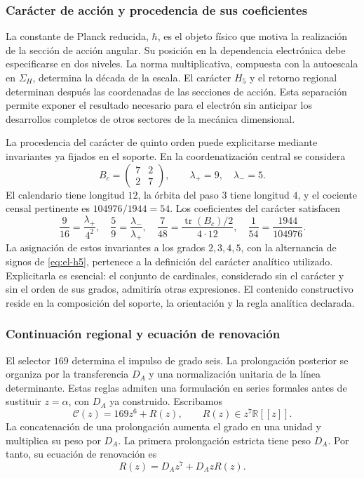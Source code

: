 \subsubsection{Carácter de acción y procedencia de sus coeficientes}
\label{sec:revision-planck}

La constante de Planck reducida, \(\hbar\), es el objeto físico que
motiva la realización de la sección de acción angular. Su posición en
la dependencia electrónica debe especificarse en dos niveles. La norma
multiplicativa, compuesta con la autoescala en \(\Sigma_H\), determina la década de la escala. El carácter
\(H_5\) y el retorno regional determinan después las coordenadas de las
secciones de acción. Esta separación permite exponer el resultado
necesario para el electrón sin anticipar los desarrollos completos de
otros sectores de la mecánica dimensional.

La procedencia del carácter de quinto orden puede explicitarse mediante
invariantes ya fijados en el soporte. En la coordenatización central se considera
\[
 B_c=\begin{pmatrix}7&2\\2&7\end{pmatrix},
 \qquad \lambda_+=9,\quad\lambda_-=5.
\]
El calendario tiene longitud \(12\), la órbita del paso \(3\) tiene
longitud \(4\), y el cociente censal pertinente es
\(104976/1944=54\). Los coeficientes del carácter satisfacen
\begin{equation}
 \frac9{16}=\frac{\lambda_+}{4^2},\quad
 \frac59=\frac{\lambda_-}{\lambda_+},\quad
 \frac7{48}=\frac{\operatorname{tr}(B_c)/2}{4\cdot12},\quad
 \frac1{54}=\frac{1944}{104976}.
 \label{eq:revision-h5-coeficientes}
\end{equation}
La asignación de estos invariantes a los grados \(2,3,4,5\), con la
alternancia de signos de \eqref{eq:el-h5}, pertenece a la definición del
carácter analítico utilizado. Explicitarla es esencial: el conjunto de
cardinales, considerado sin el carácter y sin el orden de sus grados,
admitiría otras expresiones. El contenido constructivo reside en la
composición del soporte, la orientación y la regla analítica declarada.

\subsubsection{Continuación regional y ecuación de renovación}

El selector \(169\) determina el impulso de grado seis. La prolongación
posterior se organiza por la transferencia \(D_A\) y una normalización
unitaria de la línea determinante. Estas reglas admiten una formulación
en series formales antes de sustituir \(z=\alpha\), con \(D_A\) ya
construido. Escribamos
\[
 \mathscr C(z)=169z^6+R(z),\qquad R(z)\in z^7\mathbb R[[z]].
\]
La concatenación de una prolongación aumenta el grado en una unidad y
multiplica su peso por \(D_A\). La primera prolongación estricta tiene
peso \(D_A\). Por tanto, su ecuación de renovación es
\begin{equation}
 R(z)=D_Az^7+D_AzR(z).
 \label{eq:revision-renovacion}
\end{equation}

